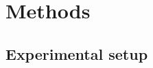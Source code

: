 \chapter[Methods]{Methods}\label{ch:methods}


\noindent \kant[21]

\section{Experimental setup}\label{sec:methods-setup}

\kant[22-23]
